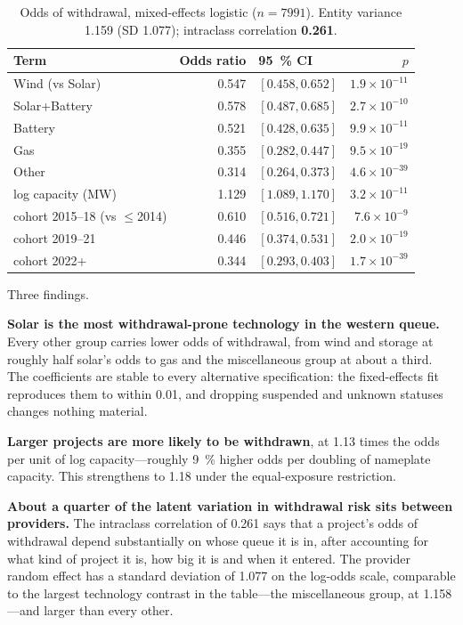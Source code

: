 \documentclass[11pt,a4paper]{article}
\begin{document}
\begin{table}[htbp]
\centering
\caption{Odds of withdrawal, mixed-effects logistic ($n = \num{7991}$). Entity
variance 1.159 (SD 1.077); intraclass correlation \textbf{0.261}.}
\begin{tabular}{lrlr}
\toprule
Term & Odds ratio & \SI{95}{\percent} CI & $p$ \\
\midrule
Wind (vs Solar)   & 0.547 & $[0.458, 0.652]$ & $1.9\times10^{-11}$ \\
Solar+Battery     & 0.578 & $[0.487, 0.685]$ & $2.7\times10^{-10}$ \\
Battery           & 0.521 & $[0.428, 0.635]$ & $9.9\times10^{-11}$ \\
Gas               & 0.355 & $[0.282, 0.447]$ & $9.5\times10^{-19}$ \\
Other             & 0.314 & $[0.264, 0.373]$ & $4.6\times10^{-39}$ \\
log capacity (MW) & 1.129 & $[1.089, 1.170]$ & $3.2\times10^{-11}$ \\
cohort 2015--18 (vs $\leq$2014) & 0.610 & $[0.516, 0.721]$ & $7.6\times10^{-9}$ \\
cohort 2019--21   & 0.446 & $[0.374, 0.531]$ & $2.0\times10^{-19}$ \\
cohort 2022+      & 0.344 & $[0.293, 0.403]$ & $1.7\times10^{-39}$ \\
\bottomrule
\end{tabular}
\end{table}

Three findings.

\textbf{Solar is the most withdrawal-prone technology in the western queue.}
Every other group carries lower odds of withdrawal, from wind and storage at
roughly half solar's odds to gas and the miscellaneous group at about a third.
The coefficients are stable to every alternative specification: the fixed-effects
fit reproduces them to within 0.01, and dropping suspended and unknown statuses
changes nothing material.

\textbf{Larger projects are more likely to be withdrawn}, at 1.13 times the odds
per unit of log capacity---roughly \SI{9}{\percent} higher odds per doubling of
nameplate capacity. This strengthens to 1.18 under the equal-exposure
restriction.

\textbf{About a quarter of the latent variation in withdrawal risk sits between
providers.} The intraclass correlation of 0.261 says that a project's odds of
withdrawal depend substantially on whose queue it is in, after accounting for
what kind of project it is, how big it is and when it entered. The provider
random effect has a standard deviation of 1.077 on the log-odds scale, comparable
to the largest technology contrast in the table---the miscellaneous group, at
1.158---and larger than every other.
\end{document}
